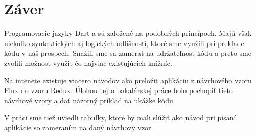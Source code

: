 \chapter*{Záver}  %

Programovacie jazyky Dart a \JS{} sú založené na podobných princípoch. Majú však niekoľko syntaktických aj logických odlišností, ktoré sme využili pri preklade kódu v náš prospech. Snažili sme sa zamerať na udržateľnosť kódu a preto sme zvolili možnosť využiť čo najviac existujúcich knižníc.

Na intenete existuje viacero návodov ako preložiť aplikáciu z návrhového vzoru Flux do vzoru Redux. Úlohou tejto bakalárskej práce bolo pochopiť tieto návrhové vzory a dať názorný príklad na ukážke kódu.

V práci sme tiež uviedli tabuľky, ktoré by mali slúžiť ako návod pri písaní aplikácie so zameraním na daný návrhový vzor.

